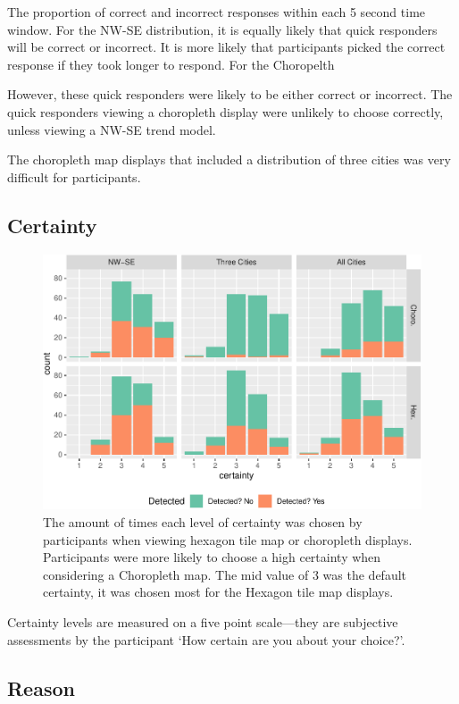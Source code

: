 \documentclass[conference,final,]{IEEEtran}
\makeatletter
\def\maxwidth{\ifdim\Gin@nat@width>\linewidth\linewidth
\else\Gin@nat@width\fi}
\let\Oldincludegraphics\includegraphics
\renewcommand{\includegraphics}[1]{\Oldincludegraphics[width=\maxwidth]{#1}}
\makeatother
\begin{document}
The proportion of correct and incorrect responses within each 5 second
time window. For the NW-SE distribution, it is equally likely that quick
responders will be correct or incorrect. It is more likely that
participants picked the correct response if they took longer to respond.
For the Choropelth

However, these quick responders were likely to be either correct or
incorrect. The quick responders viewing a choropleth display were
unlikely to choose correctly, unless viewing a NW-SE trend model.

The choropleth map displays that included a distribution of three cities
was very difficult for participants.

\hypertarget{certainty}{%
\subsection{Certainty}\label{certainty}}

\begin{figure}
\centering
\includegraphics{paper_files/figure-latex/certainty-1.pdf}
\caption{The amount of times each level of certainty was chosen by
participants when viewing hexagon tile map or choropleth displays.
Participants were more likely to choose a high certainty when
considering a Choropleth map. The mid value of 3 was the default
certainty, it was chosen most for the Hexagon tile map displays.}
\end{figure}

Certainty levels are measured on a five point scale---they are
subjective assessments by the participant `How certain are you about
your choice?'.

\hypertarget{reason}{%
\subsection{Reason}\label{reason}}
\end{document}
